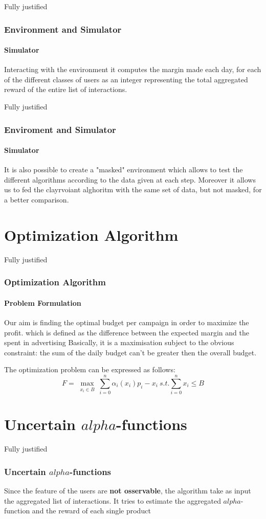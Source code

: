 \documentclass{beamer}
\begin{document}
\begin {frame}{Fully justified}
\frametitle{Environment and Simulator}
\framesubtitle{Simulator}
Interacting with the environment it computes the margin made each day, for each of the different classes of users as an integer representing the total aggregated reward of the entire list of interactions.
\end{frame}

\begin {frame}{Fully justified}
\frametitle{Enviroment and Simulator}
\framesubtitle{Simulator}
It is also possible to create a "masked" environment which allows to test the different algorithms according to the data given at each step. Moreover it allows us to fed the clayrvoiant alghoritm with the same set of data, but not masked, for a better comparison.

\end{frame}

\AtBeginSection[ ]
{
    \begin{frame}{}
    \tableofcontents[currentsection]
\end{frame}
}
\section{Optimization Algorithm}

\begin {frame}{Fully justified}
\frametitle{Optimization Algorithm}
\framesubtitle{Problem Formulation}
Our aim is finding the optimal budget per campaign in order to maximize the profit.
which is defined as the difference between the expected margin and the spent in advertising 
Basically, it is a maximisation subject to the obvious constraint: the sum of the daily budget can't be greater then the overall budget.

The optimization problem can be expressed as follows:
\begin{displaymath}
F=\max_{\substack{x_i\in B}} \sum_{i=0}^n \alpha_i(x_i)p_i-x_i \ s.t. \sum_{i=0}^n x_i\leq B  
\end{displaymath}
\end{frame}



\AtBeginSection[ ]
{
    \begin{frame}{}
    \tableofcontents[currentsection]
\end{frame}
}

\section{Uncertain $alpha$-functions}
\begin {frame}{Fully justified}
\frametitle{Uncertain $alpha$-functions}
Since the feature of the users are \textbf{not osservable}, the algorithm take as input the aggregated list of interactions.  
It tries to estimate the aggregated $alpha$-function and the reward of each single product 
\end{frame}
\end{document}
